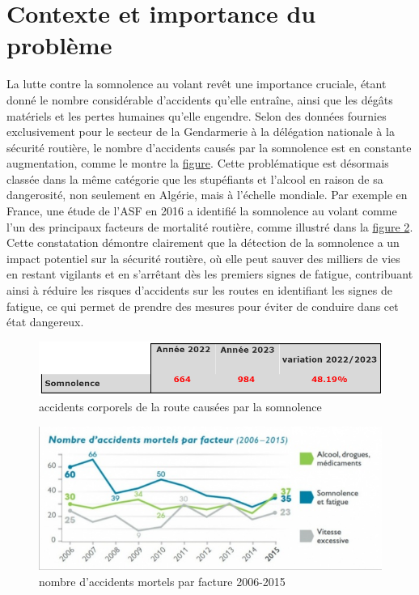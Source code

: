 \section{Contexte et importance du problème}
La lutte contre la somnolence au volant revêt une importance cruciale, étant donné le nombre considérable d'accidents qu'elle entraîne, ainsi que les dégâts matériels et les pertes humaines qu'elle engendre. Selon des données fournies exclusivement pour le secteur de la Gendarmerie à la délégation nationale à la sécurité routière, le nombre d'accidents causés par la somnolence est en constante augmentation, comme le montre la \hyperlink{fig0} {figure}. Cette problématique est désormais classée dans la même catégorie que les stupéfiants et l’alcool en raison de sa dangerosité, non seulement en Algérie, mais à l’échelle mondiale. Par exemple en France, une étude de l'ASF en 2016 a identifié la somnolence au volant comme l’un des principaux facteurs de mortalité routière, comme illustré dans la \hyperlink{fig1} {figure 2}. Cette constatation démontre clairement que la détection de la somnolence a un impact potentiel sur la sécurité routière, où elle peut sauver des milliers de vies en restant vigilants et en s’arrêtant dès les premiers signes de fatigue, contribuant ainsi à réduire les risques d’accidents sur les routes en identifiant les signes de fatigue, ce qui permet de prendre des mesures pour éviter de conduire dans cet état dangereux.
\begin{figure}[H]
\hypertarget{fig0}{}
    \centering
    \includegraphics{img/accidents.png}
    \caption{ accidents corporels de la route causées par la somnolence}
    \label{fig:enter-label}
\end{figure}
\begin{figure}[H]
\hypertarget{fig1}{}
    \centering
    \includegraphics[]{img/frn.png}
    \caption{nombre d'accidents mortels par facture 2006-2015}
    
\end{figure}
